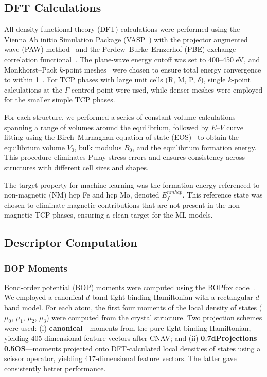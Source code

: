 
\subsection{DFT Calculations}

All density-functional theory (DFT) calculations were performed using the Vienna Ab initio Simulation Package (VASP~\cite{vasp}) with the projector augmented wave (PAW) method~\cite{paw} and the Perdew--Burke--Ernzerhof (PBE) exchange-correlation functional~\cite{pbe}. The plane-wave energy cutoff was set to 400--450 eV, and Monkhorst--Pack $k$-point meshes~\cite{monkhorst_pack} were chosen to ensure total energy convergence to within 1~\meVat. For TCP phases with large unit cells (R, M, P, $\delta$), single $k$-point calculations at the $\Gamma$-centred point were used, while denser meshes were employed for the smaller simple TCP phases.

For each structure, we performed a series of constant-volume calculations spanning a range of volumes around the equilibrium, followed by $E$--$V$ curve fitting using the Birch--Murnaghan equation of state (EOS)~\cite{birch_murnaghan} to obtain the equilibrium volume $V_0$, bulk modulus $B_0$, and the equilibrium formation energy. This procedure eliminates Pulay stress errors and ensures consistency across structures with different cell sizes and shapes.

The target property for machine learning was the formation energy referenced to non-magnetic (NM) hcp Fe and hcp Mo, denoted $E_f^{nmhcp}$. This reference state was chosen to eliminate magnetic contributions that are not present in the non-magnetic TCP phases, ensuring a clean target for the ML models.

\subsection{Descriptor Computation}

\subsubsection*{BOP Moments}

Bond-order potential (BOP) moments were computed using the BOPfox code~\cite{bopfox}. We employed a canonical $d$-band tight-binding Hamiltonian with a rectangular $d$-band model. For each atom, the first four moments of the local density of states ($\mu_0$, $\mu_1$, $\mu_2$, $\mu_3$) were computed from the crystal structure. Two projection schemes were used: (i) \textbf{canonical}---moments from the pure tight-binding Hamiltonian, yielding 405-dimensional feature vectors after CNAV; and (ii) \textbf{0.7dProjections 0.5OS}---moments projected onto DFT-calculated local densities of states using a scissor operator, yielding 417-dimensional feature vectors. The latter gave consistently better performance.

